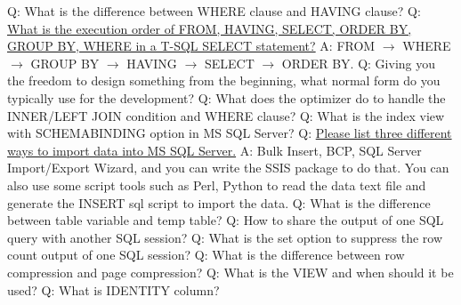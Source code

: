 \documentclass[a4paper,11pt]{article}
\begin{document}
\noindent 
Q: What is the difference between WHERE clause and HAVING clause? \newline \newline
\noindent 
Q: \ul{What is the execution order of FROM, HAVING, SELECT, ORDER BY, GROUP BY, WHERE in a T-SQL SELECT statement?} \newline
A: FROM $\rightarrow$ WHERE $\rightarrow$ GROUP BY $\rightarrow$ HAVING $\rightarrow$ SELECT $\rightarrow$ ORDER BY. \newline \newline
\noindent 
Q: Giving you the freedom to design something from the beginning, what normal form do you typically use for the development? \newline \newline
\noindent 
Q: What does the optimizer do to handle the INNER/LEFT JOIN condition and WHERE clause? \newline \newline
\noindent 
Q: What is the index view with SCHEMABINDING option in MS SQL Server? \newline \newline
\noindent 
Q: \ul{Please list three different ways to import data into MS SQL Server.} \newline
A: Bulk Insert, BCP, SQL Server Import/Export Wizard, and you can write the SSIS package to do that. You can also use some script tools such as Perl, Python to read the data text file and generate the INSERT sql script to import the data.\newline\newline
\noindent 
Q: What is the difference between table variable and temp table? \newline \newline
\noindent 
Q: How to share the output of one SQL query with another SQL session? \newline \newline
\noindent 
Q: What is the set option to suppress the row count output of one SQL session? \newline \newline
\noindent 
Q: What is the difference between row compression and page compression? \newline \newline
\noindent 
Q: What is the VIEW and when should it be used? \newline \newline
\noindent 
Q: What is IDENTITY column? \newline \newline
\end{document}
